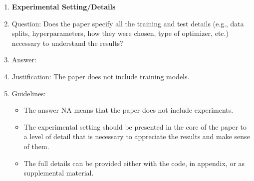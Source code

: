 \documentclass{article}
\begin{document}
{\begin{enumerate}
\item {\bf Experimental Setting/Details}
    \item[] Question: Does the paper specify all the training and test details (e.g., data splits, hyperparameters, how they were chosen, type of optimizer, etc.) necessary to understand the results?
    \item[] Answer: \answerNA{} %
    \item[] Justification: The paper does not include training models.
    \item[] Guidelines:
    \begin{itemize}
        \item The answer NA means that the paper does not include experiments.
        \item The experimental setting should be presented in the core of the paper to a level of detail that is necessary to appreciate the results and make sense of them.
        \item The full details can be provided either with the code, in appendix, or as supplemental material.
    \end{itemize}


\end{enumerate}}
\end{document}
